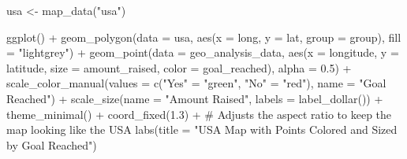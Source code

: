 \documentclass[
  letterpaper,
  DIV=11,
  numbers=noendperiod]{scrartcl}
\newenvironment{Shaded}{\begin{snugshade}}{\end{snugshade}}
\newcommand{\AttributeTok}[1]{\textcolor[rgb]{0.40,0.45,0.13}{#1}}
\newcommand{\CommentTok}[1]{\textcolor[rgb]{0.37,0.37,0.37}{#1}}
\newcommand{\DecValTok}[1]{\textcolor[rgb]{0.68,0.00,0.00}{#1}}
\newcommand{\FloatTok}[1]{\textcolor[rgb]{0.68,0.00,0.00}{#1}}
\newcommand{\FunctionTok}[1]{\textcolor[rgb]{0.28,0.35,0.67}{#1}}
\newcommand{\NormalTok}[1]{\textcolor[rgb]{0.00,0.23,0.31}{#1}}
\newcommand{\OtherTok}[1]{\textcolor[rgb]{0.00,0.23,0.31}{#1}}
\newcommand{\SpecialCharTok}[1]{\textcolor[rgb]{0.37,0.37,0.37}{#1}}
\newcommand{\StringTok}[1]{\textcolor[rgb]{0.13,0.47,0.30}{#1}}
\begin{document}
\begin{Shaded}
\end{Shaded}

\begin{Shaded}
\begin{Highlighting}[]
\NormalTok{usa }\OtherTok{\textless{}{-}} \FunctionTok{map\_data}\NormalTok{(}\StringTok{"usa"}\NormalTok{)}

\FunctionTok{ggplot}\NormalTok{() }\SpecialCharTok{+}
  \FunctionTok{geom\_polygon}\NormalTok{(}\AttributeTok{data =}\NormalTok{ usa, }\FunctionTok{aes}\NormalTok{(}\AttributeTok{x =}\NormalTok{ long, }\AttributeTok{y =}\NormalTok{ lat, }\AttributeTok{group =}\NormalTok{ group), }\AttributeTok{fill =} \StringTok{"lightgrey"}\NormalTok{) }\SpecialCharTok{+}
  \FunctionTok{geom\_point}\NormalTok{(}\AttributeTok{data =}\NormalTok{ geo\_analysis\_data, }\FunctionTok{aes}\NormalTok{(}\AttributeTok{x =}\NormalTok{ longitude, }\AttributeTok{y =}\NormalTok{ latitude, }\AttributeTok{size =}\NormalTok{ amount\_raised, }\AttributeTok{color =}\NormalTok{ goal\_reached), }\AttributeTok{alpha =} \FloatTok{0.5}\NormalTok{) }\SpecialCharTok{+}
  \FunctionTok{scale\_color\_manual}\NormalTok{(}\AttributeTok{values =} \FunctionTok{c}\NormalTok{(}\StringTok{"Yes"} \OtherTok{=} \StringTok{"green"}\NormalTok{, }\StringTok{"No"} \OtherTok{=} \StringTok{"red"}\NormalTok{), }\AttributeTok{name =} \StringTok{"Goal Reached"}\NormalTok{) }\SpecialCharTok{+}
  \FunctionTok{scale\_size}\NormalTok{(}\AttributeTok{name =} \StringTok{"Amount Raised"}\NormalTok{, }\AttributeTok{labels =} \FunctionTok{label\_dollar}\NormalTok{()) }\SpecialCharTok{+}
  \FunctionTok{theme\_minimal}\NormalTok{() }\SpecialCharTok{+}
  \FunctionTok{coord\_fixed}\NormalTok{(}\FloatTok{1.3}\NormalTok{) }\SpecialCharTok{+}  \CommentTok{\# Adjusts the aspect ratio to keep the map looking like the USA}
  \FunctionTok{labs}\NormalTok{(}\AttributeTok{title =} \StringTok{"USA Map with Points Colored and Sized by Goal Reached"}\NormalTok{)}
\end{Highlighting}
\end{Shaded}
\end{document}
